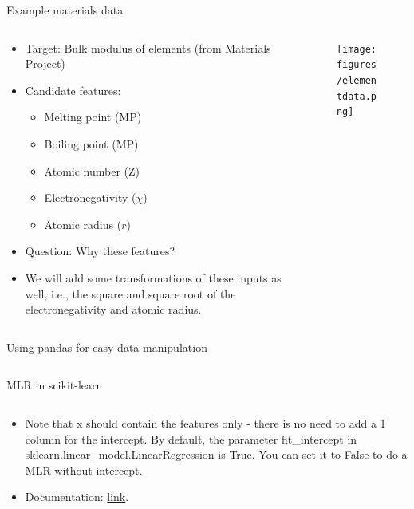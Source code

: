 \documentclass[aspectratio=169]{beamer}
\begin{document}
\begin{frame}{Example materials data}
    \begin{columns}
    \begin{column}{0.6\textwidth}
        \begin{itemize}
            \item Target: Bulk modulus of elements (from Materials Project)
            \item Candidate features:
            \begin{itemize}
                \item Melting point (MP)
                \item Boiling point (MP)
                \item Atomic number (Z)
                \item Electronegativity ($\chi$)
                \item Atomic radius ($r$)
            \end{itemize}
            \item Question: Why these features?
            \item We will add some transformations of these inputs as well, i.e., the square and square root of the electronegativity and atomic radius.
    \end{itemize}
    \end{column}
    \begin{column}{0.3\textwidth}
        \begin{figure}
        \centering
        \texttt{[image: figures/elementdata.png]}
    \end{figure}
    \end{column}
\end{columns}
\end{frame} 


\begin{frame}[fragile]{Using pandas for easy data manipulation}
    \inputminted{python}{example_pandas_data_manipulation.py}
\end{frame} 


\begin{frame}[fragile]{MLR in scikit-learn}
\inputminted{python}{example_sklearn_mlr.py}
\begin{itemize}
    \item Note that x should contain the features only - there is no need to add a 1 column for the intercept. By default, the parameter fit\_intercept in sklearn.linear\_model.LinearRegression is True. You can set it to False to do a MLR without intercept.
    \item Documentation: \href{https://scikit-learn.org/stable/modules/generated/sklearn.linear_model.LinearRegression.html}{link}.
\end{itemize}

\end{frame} 
\end{document}
